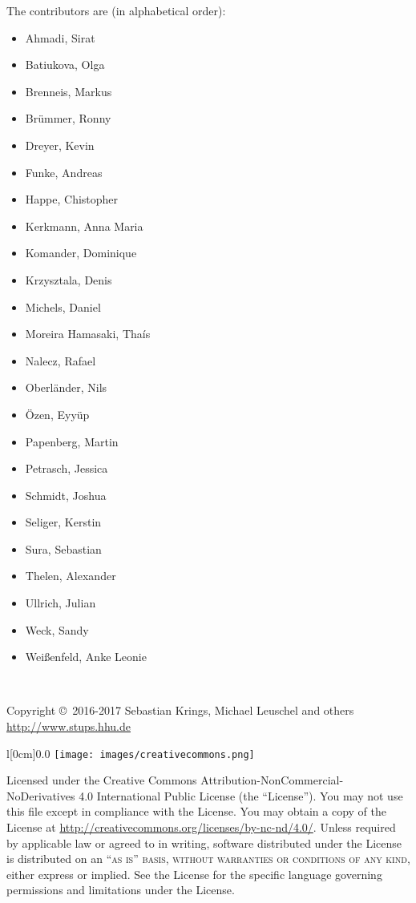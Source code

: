 \documentclass[11pt,oneside]{book} %
\begin{document}
\noindent
The contributors are (in alphabetical order):
\begin{itemize}
    \item Ahmadi, Sirat
    \item Batiukova, Olga
    \item Brenneis, Markus
    \item Brümmer, Ronny
    \item Dreyer, Kevin
    \item Funke, Andreas
    \item Happe, Chistopher
    \item Kerkmann, Anna Maria
    \item Komander, Dominique
    \item Krzysztala, Denis
    \item Michels, Daniel
    \item Moreira Hamasaki, Thaís
    \item Nalecz, Rafael
    \item Oberländer, Nils
    \item Özen, Eyyüp
    \item Papenberg, Martin
    \item Petrasch, Jessica
    \item Schmidt, Joshua
    \item Seliger, Kerstin
    \item Sura, Sebastian
    \item Thelen, Alexander
    \item Ullrich, Julian
    \item Weck, Sandy
    \item Weißenfeld, Anke Leonie
\end{itemize}

~\vfill

\noindent Copyright \copyright\ 2016-2017 Sebastian Krings, Michael Leuschel and others\\ %


\noindent \url{http://www.stups.hhu.de}\\ %

\noindent
\begin{wrapfigure}[4]{l}[0cm]{0.0\textwidth}
\texttt{[image: images/creativecommons.png]}
\end{wrapfigure}
 Licensed under the Creative Commons Attribution-NonCommercial-NoDerivatives 4.0 International Public License (the ``License''). You may not use this file except in compliance with the License. You may obtain a copy of the License at \url{http://creativecommons.org/licenses/by-nc-nd/4.0/}. Unless required by applicable law or agreed to in writing, software distributed under the License is distributed on an \textsc{``as is'' basis, without warranties or conditions of any kind}, either express or implied. See the License for the specific language governing permissions and limitations under the License.\\ %
\end{document}
